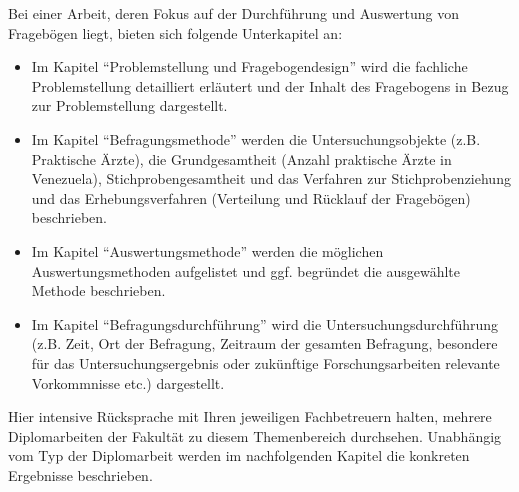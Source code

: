 Bei einer Arbeit, deren Fokus auf der Durchführung und Auswertung von Fragebögen liegt, bieten sich folgende Unterkapitel an:
\begin{itemize}
	\item Im Kapitel \enquote{Problemstellung und Fragebogendesign} wird die fachliche Problemstellung detailliert erläutert und der Inhalt des Fragebogens in Bezug zur Problemstellung dargestellt.
	\item Im Kapitel \enquote{Befragungsmethode} werden die Untersuchungsobjekte (z.B. Praktische Ärzte), die Grundgesamtheit (Anzahl praktische Ärzte in Venezuela), Stichprobengesamtheit und das Verfahren zur Stichprobenziehung und das Erhebungsverfahren (Verteilung und Rücklauf der Fragebögen) beschrieben.
	\item Im Kapitel \enquote{Auswertungsmethode} werden die möglichen Auswertungsmethoden aufgelistet und ggf. begründet die ausgewählte Methode beschrieben.
	\item Im Kapitel \enquote{Befragungsdurchführung} wird die Untersuchungsdurchführung (z.B. Zeit, Ort der Befragung, Zeitraum der gesamten Befragung, besondere für das Untersuchungsergebnis oder zukünftige Forschungsarbeiten relevante Vorkommnisse etc.) dargestellt.
\end{itemize}

Hier intensive Rücksprache mit Ihren jeweiligen Fachbetreuern halten, mehrere Diplomarbeiten der Fakultät zu diesem Themenbereich durchsehen. Unabhängig vom Typ der Diplomarbeit werden im nachfolgenden Kapitel die konkreten Ergebnisse beschrieben.
\fi\makeatother